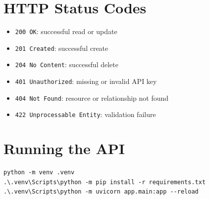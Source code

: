\documentclass[11pt,a4paper]{article}
\begin{document}
\section{HTTP Status Codes}
\begin{itemize}
    \item \texttt{200 OK}: successful read or update
    \item \texttt{201 Created}: successful create
    \item \texttt{204 No Content}: successful delete
    \item \texttt{401 Unauthorized}: missing or invalid API key
    \item \texttt{404 Not Found}: resource or relationship not found
    \item \texttt{422 Unprocessable Entity}: validation failure
\end{itemize}

\section{Running the API}
\begin{lstlisting}[style=jsonstyle]
python -m venv .venv
.\.venv\Scripts\python -m pip install -r requirements.txt
.\.venv\Scripts\python -m uvicorn app.main:app --reload
\end{lstlisting}
\end{document}
